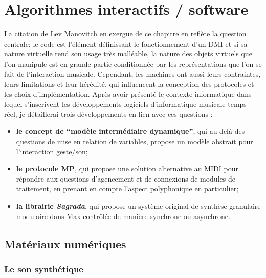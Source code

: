 %
\chapter{Algorithmes interactifs / software}
\label{ch:algorithms}



\noindent La citation de Lev Manovitch en exergue de ce chapitre en reflète la question centrale: le code est l'élément définissant le fonctionnement d'un \gls{DMI} et si sa nature virtuelle rend son usage très malléable, la nature des objets virtuels que l'on manipule est en grande partie conditionnée par les représentations que l'on se fait de l'interaction musicale. Cependant, les machines ont aussi leurs contraintes, leurs limitations et leur hérédité, qui influencent la conception des protocoles et les choix d'implémentation. Après avoir présenté le contexte informatique dans lequel s'inscrivent les développements logiciels d'informatique musicale temps-réel, je détaillerai trois développements en lien avec ces questions :
\vspace{-1em}
\begin{itemize}[noitemsep]
	\item \textbf{le concept de ``modèle intermédiaire dynamique''}, qui au-delà des questions de mise en relation de variables, propose un modèle abstrait pour l'interaction geste/son;
	\item \textbf{le protocole MP}, qui propose une solution alternative au \gls{MIDI} pour répondre aux questions d'agencement et de connexions de modules de traitement, en prenant en compte l'aspect polyphonique en particulier;
	\item \textbf{la librairie \textit{Sagrada}}, qui propose un système original de synthèse granulaire modulaire dans Max contrôlée de manière synchrone ou asynchrone.
\end{itemize}

\section{Matériaux numériques}

\subsection{Le son synthétique}

